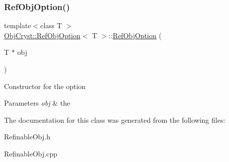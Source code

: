 \subsubsection{\texorpdfstring{RefObjOption()}{RefObjOption()}}
{\footnotesize\ttfamily template$<$class T $>$ \\
\mbox{\hyperlink{class_obj_cryst_1_1_ref_obj_option}{Obj\+Cryst\+::\+Ref\+Obj\+Option}}$<$ T $>$\+::\mbox{\hyperlink{class_obj_cryst_1_1_ref_obj_option}{Ref\+Obj\+Option}} (\begin{DoxyParamCaption}\item[{T $\ast$}]{obj }\end{DoxyParamCaption})}

Constructor for the option 
\begin{DoxyParams}{Parameters}
{\em obj} & the \\
\hline
\end{DoxyParams}


The documentation for this class was generated from the following files\+:\begin{DoxyCompactItemize}
\item 
Refinable\+Obj.\+h\item 
Refinable\+Obj.\+cpp\end{DoxyCompactItemize}
